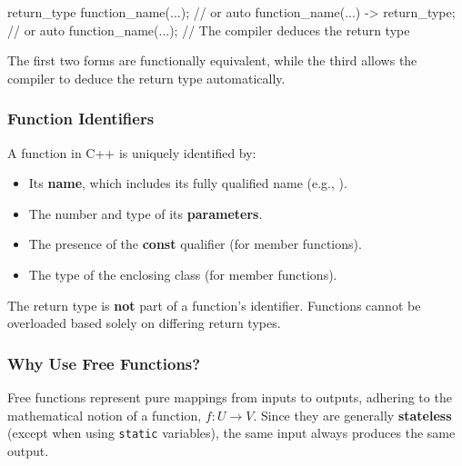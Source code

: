\vspace{-0.5em}

\begin{codeblock}[language=C++, numbers=none]
return_type function_name(...);
// or
auto function_name(...) -> return_type;
// or
auto function_name(...); // The compiler deduces the return type
\end{codeblock}

\vspace{-0.5em}

The first two forms are functionally equivalent, while the third allows the compiler to deduce the return type automatically.

\vspace{-0.5em}

\subsubsection{Function Identifiers}

\vspace{-0.5em}

A function in C++ is uniquely identified by:

\begin{itemize}
    \item Its \textbf{name}, which includes its fully qualified name (e.g., ).
    \item The number and type of its \textbf{parameters}.
    \item The presence of the \textbf{const} qualifier (for member functions).
    \item The type of the enclosing class (for member functions).
\end{itemize}

\begin{warningblock}
    The return type is \textbf{not} part of a function's identifier. Functions cannot be overloaded based solely on differing return types.
\end{warningblock}

\subsubsection{Why Use Free Functions?}

\vspace{-0.5em}

Free functions represent pure mappings from inputs to outputs, adhering to the mathematical notion of a function, $f: U \rightarrow V$. Since they are generally \textbf{stateless} (except when using \texttt{static} variables), the same input always produces the same output.

